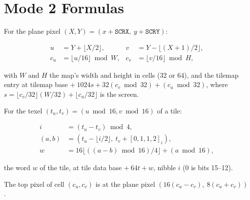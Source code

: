 \section{Mode 2 Formulas}

For the plane pixel $(X, Y) = (x + \texttt{SCRX},\ y + \texttt{SCRY})$:

\begin{align*}
	u   & = Y + \lfloor X/2 \rfloor,      & v   & = Y - \lfloor (X+1)/2 \rfloor,  \\
	c_u & = \lfloor u/16 \rfloor \bmod W, & c_v & = \lfloor v/16 \rfloor \bmod H,
\end{align*}

\noindent with $W$ and $H$ the map's width and height in cells (32 or 64), and the tilemap entry at tilemap base
$+\ 1024 s + 32 (c_v \bmod 32) + (c_u \bmod 32)$, where $s = \lfloor c_v/32 \rfloor (W/32) + \lfloor c_u/32 \rfloor$ is the screen.

For the texel $(t_u, t_v) = (u \bmod 16, v \bmod 16)$ of a tile:

\begin{align*}
	i      & = (t_u - t_v) \bmod 4,                                    \\
	(a, b) & = (t_u - \lfloor i/2 \rfloor,\ t_v + [0, 1, 1, 2]_i),     \\
	w      & = 16 \lfloor ((a - b) \bmod 16)/4 \rfloor + (a \bmod 16),
\end{align*}

\noindent the word $w$ of the tile, at tile data base $+\ 64t + w$, nibble $i$ (0 is bits 15--12).

The top pixel of cell $(c_u, c_v)$ is at the plane pixel $(16(c_u - c_v),\ 8(c_u + c_v))$.

